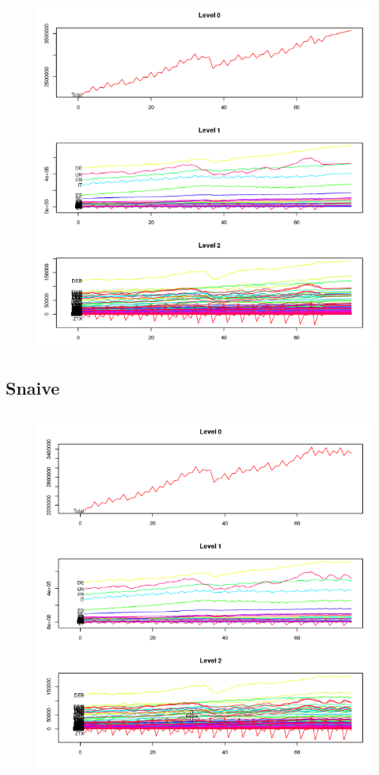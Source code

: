 \documentclass[c, dvipsnames]{beamer}  %
\begin{document}
\begin{frame}[shrink=5]
\frametitle{\insertsection} 
\framesubtitle{\insertsubsection}


\begin{figure}
	\centering
	\includegraphics[width=0.7\linewidth]{screenshot029}
	\label{fig:screenshot029}
\end{figure}


\end{frame}


\subsection{Snaive}


\begin{frame}[shrink=5]
\frametitle{\insertsection} 
\framesubtitle{\insertsubsection}


\begin{figure}
	\centering
	\includegraphics[width=0.7\linewidth]{screenshot032}
	\label{fig:screenshot029}
\end{figure}


\end{frame}
\end{document}
